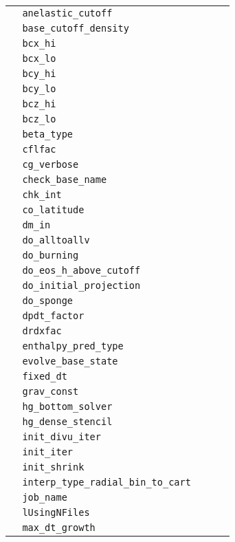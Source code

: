 \begin{center}
\begin{longtable}{|l|p{3.0in}|l|}
\verb=  anelastic_cutoff  = &   &   \\
\verb=  base_cutoff_density  = &   &   \\
\verb=  bcx_hi  = &   &   \\
\verb=  bcx_lo  = &   &   \\
\verb=  bcy_hi  = &   &   \\
\verb=  bcy_lo  = &   &   \\
\verb=  bcz_hi  = &   &   \\
\verb=  bcz_lo  = &   &   \\
\verb=  beta_type  = &   &   \\
\verb=  cflfac  = &   &   \\
\verb=  cg_verbose  = &   &   \\
\verb=  check_base_name  = &   &   \\
\verb=  chk_int  = &   &   \\
\verb=  co_latitude  = &   &   \\
\verb=  dm_in  = &   &   \\
\verb=  do_alltoallv  = &   &   \\
\verb=  do_burning  = &   &   \\
\verb=  do_eos_h_above_cutoff  = &   &   \\
\verb=  do_initial_projection  = &   &   \\
\verb=  do_sponge  = &   &   \\
\verb=  dpdt_factor  = &   &   \\
\verb=  drdxfac  = &   &   \\
\verb=  enthalpy_pred_type  = &   &   \\
\verb=  evolve_base_state  = &   &   \\
\verb=  fixed_dt  = &   &   \\
\verb=  grav_const  = &   &   \\
\verb=  hg_bottom_solver  = &   &   \\
\verb=  hg_dense_stencil  = &   &   \\
\verb=  init_divu_iter  = &   &   \\
\verb=  init_iter  = &   &   \\
\verb=  init_shrink  = &   &   \\
\verb=  interp_type_radial_bin_to_cart  = &   &   \\
\verb=  job_name  = &   &   \\
\verb=  lUsingNFiles  = &   &   \\
\verb=  max_dt_growth  = &   &   \\

\end{longtable}
\end{center}
